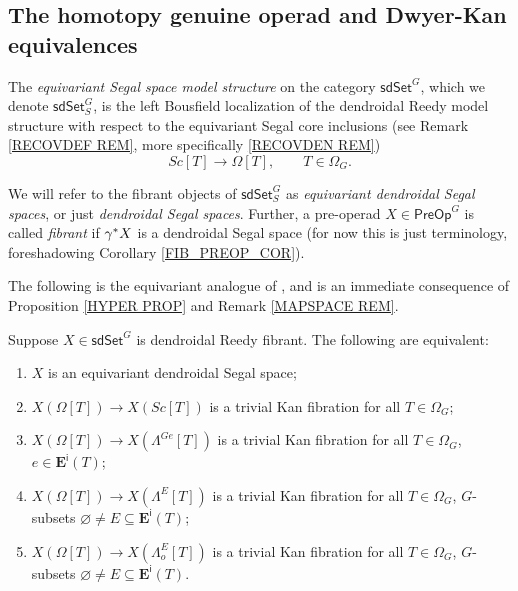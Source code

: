\documentclass[a4paper,10pt
 ,draft
]{article}%
\begin{document}
\subsection{The homotopy genuine operad and Dwyer-Kan equivalences}\label{HMPTYGEN SEC}


\begin{definition}
	The \textit{equivariant Segal space model structure} on the category $\mathsf{sdSet}^G$, which we denote 
	$\mathsf{sdSet}^G_S$, 
	is the left Bousfield localization of the dendroidal Reedy model structure with respect to the equivariant Segal core inclusions 
	(see Remark \ref{RECOVDEF REM}, more specifically \eqref{RECOVDEN REM})
\[
	Sc[T] \to \Omega[T], \qquad T \in \Omega_G.
\]
\end{definition}


\begin{notation}\label{FIB_PREOP_NOT}
We will refer to the fibrant objects of
$\mathsf{sdSet}^G_S$
as \textit{equivariant dendroidal Segal spaces}, 
or just \textit{dendroidal Segal spaces}.
Further, a pre-operad $X \in \mathsf{PreOp}^G$ is called \textit{fibrant}
if $\gamma^{\**}X$ is a dendroidal Segal space
(for now this is just terminology,
foreshadowing Corollary \ref{FIB_PREOP_COR}).
\end{notation}

The following is the equivariant analogue of \cite[Cor. 5.6]{CM13a}, and is an immediate consequence of Proposition \ref{HYPER PROP} and Remark \ref{MAPSPACE REM}.
\begin{proposition}
      \label{DSSCHAR_PROP}
      Suppose $X \in \mathsf{sdSet}^G$ is dendroidal Reedy fibrant. The following are equivalent:
      \begin{enumerate}[label = (\roman*)]
      \item $X$ is an equivariant dendroidal Segal space;
      \item $X(\Omega[T]) \to X(Sc[T])$ is a trivial Kan fibration for all $T \in \Omega_G$;
	\item $X(\Omega[T]) \to X(\Lambda^{Ge}[T])$ is a trivial Kan fibration for all $T \in \Omega_G$, $e \in \boldsymbol E^{\mathsf{i}}(T)$;
      \item $X(\Omega[T]) \to X(\Lambda^E[T])$ is a trivial Kan fibration for all $T \in \Omega_G$, $G$-subsets $\varnothing \neq E \subseteq \boldsymbol E^{\mathsf{i}}(T)$;
      \item $X(\Omega[T]) \to X(\Lambda_o^E[T])$ is a trivial Kan fibration for all $T \in \Omega_G$, $G$-subsets $\varnothing \neq E \subseteq \boldsymbol E^{\mathsf{i}}(T)$.
      \end{enumerate}
\end{proposition}
\end{document}
